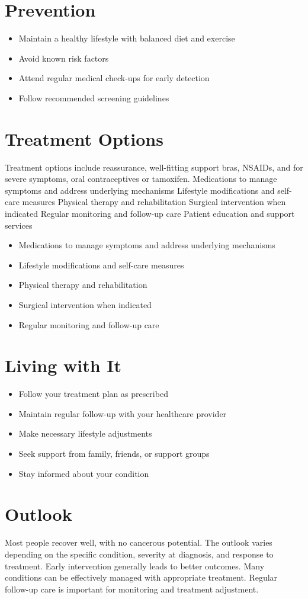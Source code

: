 \section{Prevention}
\begin{itemize}[noitemsep]
  \item Maintain a healthy lifestyle with balanced diet and exercise
  \item Avoid known risk factors
  \item Attend regular medical check-ups for early detection
  \item Follow recommended screening guidelines
\end{itemize}
\section{Treatment Options}
Treatment options include reassurance, well-fitting support bras, NSAIDs, and for severe symptoms, oral contraceptives or tamoxifen. Medications to manage symptoms and address underlying mechanisms Lifestyle modifications and self-care measures Physical therapy and rehabilitation Surgical intervention when indicated Regular monitoring and follow-up care Patient education and support services

\begin{itemize}[noitemsep]
  \item Medications to manage symptoms and address underlying mechanisms
  \item Lifestyle modifications and self-care measures
  \item Physical therapy and rehabilitation
  \item Surgical intervention when indicated
  \item Regular monitoring and follow-up care
\end{itemize}
\section{Living with It}
\begin{itemize}[noitemsep]
  \item Follow your treatment plan as prescribed
  \item Maintain regular follow-up with your healthcare provider
  \item Make necessary lifestyle adjustments
  \item Seek support from family, friends, or support groups
  \item Stay informed about your condition
\end{itemize}
\section{Outlook}
Most people recover well, with no cancerous potential. The outlook varies depending on the specific condition, severity at diagnosis, and response to treatment. Early intervention generally leads to better outcomes. Many conditions can be effectively managed with appropriate treatment. Regular follow-up care is important for monitoring and treatment adjustment.
